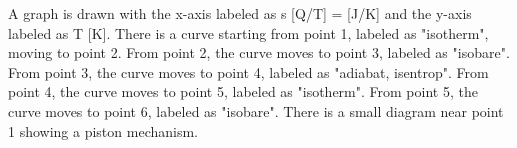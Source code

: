 A graph is drawn with the x-axis labeled as s [Q/T] = [J/K] and the y-axis labeled as T [K]. There is a curve starting from point 1, labeled as "isotherm", moving to point 2. From point 2, the curve moves to point 3, labeled as "isobare". From point 3, the curve moves to point 4, labeled as "adiabat, isentrop". From point 4, the curve moves to point 5, labeled as "isotherm". From point 5, the curve moves to point 6, labeled as "isobare". There is a small diagram near point 1 showing a piston mechanism.